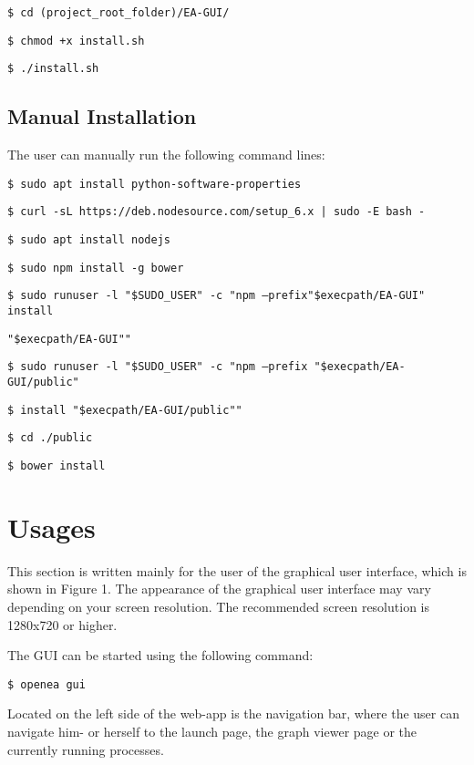 \documentclass[11pt,a4paper]{article}
\begin{document}
\texttt{\$ cd (project\_root\_folder)/EA-GUI/}

\texttt{\$ chmod +x install.sh}

\texttt{\$ ./install.sh}

\subsection{Manual Installation}

The user can manually run the following command lines:

\texttt{\$ sudo apt install python-software-properties}

\texttt{\$ curl -sL https://deb.nodesource.com/setup\_6.x | sudo -E bash -}

\texttt{\$ sudo apt install nodejs}

\texttt{\$ sudo npm install -g bower}

\texttt{\$ sudo runuser -l "\$SUDO\_USER" -c "npm --prefix"\$execpath/EA-GUI" install}

\texttt{"\$execpath/EA-GUI""}

\texttt{\$ sudo runuser -l "\$SUDO\_USER" -c "npm --prefix "\$execpath/EA-GUI/public"}

\texttt{\$ install "\$execpath/EA-GUI/public""}

\texttt{\$ cd ./public}

\texttt{\$ bower install}

\section{Usages}

This section is written mainly for the user of the graphical user interface, which is shown in Figure 1. The appearance of the graphical user interface may vary depending on your screen resolution. The recommended screen resolution is 1280x720 or higher.

The GUI can be started using the following command:

\texttt{\$ openea gui}

Located on the left side of the web-app is the navigation bar, where the user can navigate him- or herself to the launch page, the graph viewer page or the currently running processes.
\end{document}
